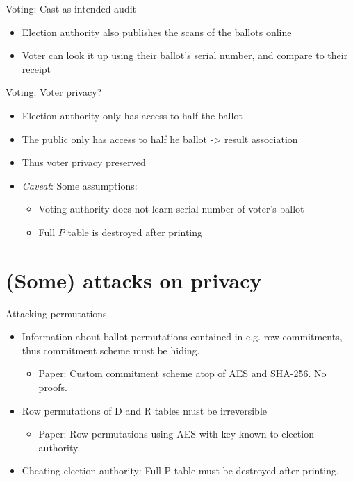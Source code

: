 \documentclass{beamer}
\begin{document}
\begin{frame}{Voting: Cast-as-intended audit}
	\begin{itemize}
		\item Election authority also publishes the scans of the ballots online
		\item Voter can look it up using their ballot's serial number, and compare to their receipt
	\end{itemize}
\end{frame}

\begin{frame}{Voting: Voter privacy?}
	\begin{itemize}
		\item Election authority only has access to half the ballot
		\item The public only has access to half he ballot -> result association
		\item Thus voter privacy preserved
		\item \emph{Caveat}: Some assumptions:
			\begin{itemize}
				\item Voting authority does not learn serial number of voter's ballot
				\item Full $P$ table is destroyed after printing
			\end{itemize}
	\end{itemize}
\end{frame}

\section{(Some) attacks on privacy}

\begin{frame}{Attacking permutations}
	\begin{itemize}
		\item Information about ballot permutations contained in e.g. row commitments, thus commitment scheme must be hiding.
			\begin{itemize}
				\item Paper: Custom commitment scheme atop of AES and SHA-256. No proofs.
			\end{itemize}
		\item Row permutations of D and R tables must be irreversible
			\begin{itemize}
				\item Paper: Row permutations using AES with key known to election authority.
			\end{itemize}
		\item Cheating election authority: Full P table must be destroyed
			after printing.
	\end{itemize}
\end{frame}
\end{document}
